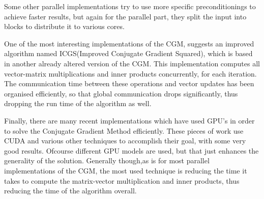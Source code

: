 \documentclass[12pt,a4paper]{article}
\begin{document}
Some other parallel implementations try to use more specific preconditionings to achieve faster results, but again for the parallel part, they split the input into blocks to distribute it to various cores\cite{adams1985m}\cite{adams1983m}. 

One of the most interesting implementations of the CGM, suggests an improved algorithm named ICGS(Improved Conjugate Gradient Squared), which is based in another already altered version of the CGM\cite{maheswaran1999mcgs}. This implementation computes all vector-matrix  multiplications and inner products concurrently, for each iteration. The communication time between these operations and vector updates has been organised efficiently, so that global communication drops significantly, thus dropping the run time of the algorithm as well\cite{yang2001improved}.

Finally, there are many recent implementations which have used GPU's in order to solve the Conjugate Gradient Method efficiently. These pieces of work use CUDA and various other techniques to accomplish their goal, with some very good results. Ofcourse different GPU models are used, but that just enhances the generality of the solution. Generally though,as is for most parallel implementations of the CGM, the most used technique is reducing the time it takes to compute the matrix-vector multiplication and inner products, thus reducing the time of the algorithm overall\cite{galiano2012gpu}\cite{wozniak2010parallel}.
\newpage


\cite{navaridas2009understanding}
\cite{sharp2012power}
\cite{davies2010interfacing}
\cite{sharp2011event}
\cite{gerstner2002spiking}
\cite{press2007numerical}
\cite{shewchuk1994introduction}
\cite{cgm2009lec}
\cite{o1987parallel}
\cite{adams1985m}
\cite{maheswaran1999mcgs}
\cite{yang2001improved}
\cite{adams1983m}
\cite{galiano2012gpu}
\cite{wozniak2010parallel}
\cite{hestenes1952methods}
\cite{rosenbloom1956method}
\cite{furber2007neural}
\cite{spinnweb}
\cite{khan2008spinnaker}
\cite{docfile}
\cite{plana2007gals}
\cite{furber2012overview}
\cite{bose2005spiking}
\end{document}
